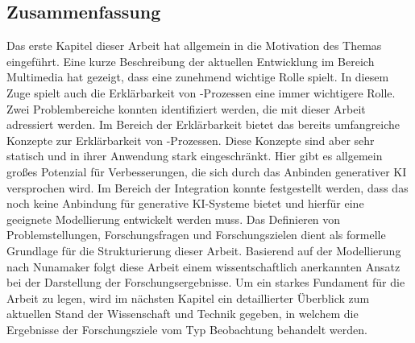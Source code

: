 

\clearpage

\subsection{Zusammenfassung}
\label{sec1:intro:subsec:summary}
Das erste Kapitel dieser Arbeit hat allgemein in die Motivation des Themas eingeführt. 
Eine kurze Beschreibung der aktuellen Entwicklung im Bereich Multimedia hat gezeigt, dass \mmir{} eine zunehmend wichtige Rolle spielt.
In diesem Zuge spielt auch die Erklärbarkeit von \mmir{}-Prozessen eine immer wichtigere Rolle.
\newline
Zwei Problembereiche konnten identifiziert werden, die mit dieser Arbeit adressiert werden.
Im Bereich der Erklärbarkeit bietet das \gmaf{} bereits umfangreiche Konzepte zur Erklärbarkeit von \mmir{}-Prozessen.
Diese Konzepte sind aber sehr statisch und in ihrer Anwendung stark eingeschränkt.
Hier gibt es allgemein großes Potenzial für Verbesserungen, die sich durch das Anbinden generativer KI versprochen wird.
Im Bereich der Integration konnte festgestellt werden, dass das \gmaf{} noch keine Anbindung für generative KI-Systeme bietet und hierfür eine geeignete Modellierung entwickelt werden muss.
\newline
Das Definieren von Problemstellungen, Forschungsfragen und Forschungszielen dient als formelle Grundlage für die Strukturierung dieser Arbeit. 
Basierend auf der Modellierung nach Nunamaker folgt diese Arbeit einem wissentschaftlich anerkannten Ansatz bei der Darstellung der Forschungsergebnisse.
\newline
Um ein starkes Fundament für die Arbeit zu legen, wird im nächsten Kapitel ein detaillierter Überblick zum aktuellen Stand der Wissenschaft und Technik gegeben, in welchem die Ergebnisse der Forschungsziele vom Typ Beobachtung behandelt werden.

\clearpage